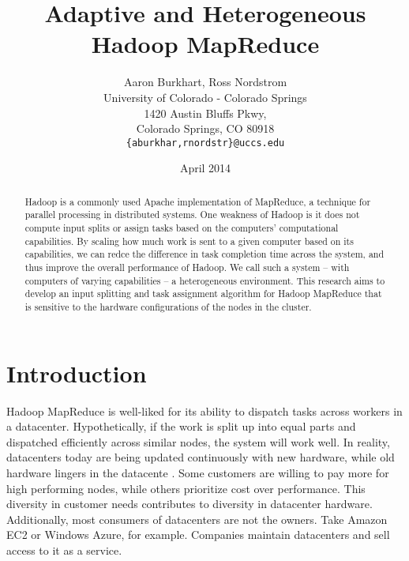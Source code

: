\documentclass{sig-alternate}
\begin{document}
\title{Adaptive and Heterogeneous Hadoop MapReduce}
\author{Aaron Burkhart, Ross Nordstrom\\
        University of Colorado - Colorado Springs\\
        1420 Austin Bluffs Pkwy,\\
        Colorado Springs, CO 80918\\
        \texttt{\{aburkhar,rnordstr\}@uccs.edu}
       }
\date{April 2014}

\maketitle

\begin{abstract}
Hadoop is a commonly used Apache implementation of MapReduce, a technique for
parallel processing in distributed systems. One weakness of Hadoop is it does
not compute input splits or assign tasks based on the computers’ computational capabilities. By scaling
how much work is sent to a given computer based on its capabilities, we can
redce the difference in task completion time across the system, and thus improve
the overall performance of Hadoop. We call such a system – with computers of
varying capabilities – a heterogeneous environment. This research aims to develop
an input splitting and task assignment algorithm for Hadoop MapReduce that is sensitive 
to the hardware configurations of the nodes in the cluster.
\end{abstract}


\section{Introduction}
Hadoop MapReduce is well-liked for its ability to dispatch tasks across workers
in a datacenter. Hypothetically, if the work is split up into equal parts and dispatched
efficiently across similar nodes, the system will work well. In reality, datacenters today are being
updated continuously with new hardware, while old hardware lingers in the datacente
. Some customers are willing to pay more for high performing nodes, while others prioritize cost over
performance. This diversity in customer needs contributes to diversity in datacenter hardware. 
Additionally, most consumers of datacenters are not the owners. Take Amazon EC2
or Windows Azure, for example. Companies maintain datacenters and sell access to
it as a service. 
\end{document}
